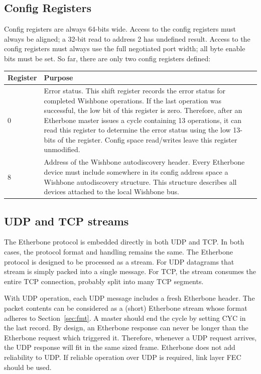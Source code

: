 \documentclass{article}
\begin{document}
\subsection{Config Registers}
\label{sec:config}

Config registers are always 64-bits wide.
Access to the config registers must always be aligned;
a 32-bit read to address 2 has undefined result.
Access to the config registers must always use the full negotiated port width;
all byte enable bits must be set.
So far, there are only two config registers defined:

\begin{tabular}{|l|p{}|}
\hline
Register & Purpose \\
\hline
0 &
Error status.
This shift register records the error status for completed Wishbone
operations.
If the last operation was successful,
the low bit of this register is zero.
Therefore, 
after an Etherbone master issues a cycle containing 13 operations,
it can read this register to determine the error status using the low
13-bits of the register.
Config space read/writes leave this register unmodified.
\\
\hline
8 &
Address of the Wishbone autodiscovery header.
Every Etherbone device must include somewhere in its config address space
a Wishbone autodiscovery structure.
This structure describes all devices attached to the local Wishbone bus.
\\
\hline
\end{tabular}

\subsection{UDP and TCP streams}

The Etherbone protocol is embedded directly in both UDP and TCP.
In both cases, the protocol format and handling remains the same.
The Etherbone protocol is designed to be processed as a stream.
For UDP datagrams that stream is simply packed into a single message.
For TCP, the stream consumes the entire TCP connection,
probably split into many TCP segments.

With UDP operation,
each UDP message includes a fresh Etherbone header.
The packet contents can be considered as a (short) Etherbone stream
whose format adheres to Section~\ref{sec:fmt}.
A master should end the cycle by setting CYC in the last record.
By design,
an Etherbone response can never be longer than the Etherbone request
which triggered it.
Therefore, whenever a UDP request arrives, 
the UDP response will fit in the same sized frame.
Etherbone does not add reliability to UDP.
If reliable operation over UDP is required, 
link layer FEC should be used.
\end{document}
